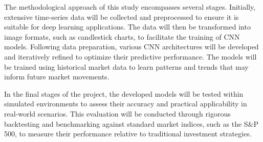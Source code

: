 \thesisspacing %

The methodological approach of this study encompasses several stages. Initially, extensive time-series data will be collected and preprocessed to ensure it is suitable for deep learning applications. The data will then be transformed into image formats, such as candlestick charts, to facilitate the training of CNN models. Following data preparation, various CNN architectures will be developed and iteratively refined to optimize their predictive performance. The models will be trained using historical market data to learn patterns and trends that may inform future market movements.

In the final stages of the project, the developed models will be tested within simulated environments to assess their accuracy and practical applicability in real-world scenarios. This evaluation will be conducted through rigorous backtesting and benchmarking against standard market indices, such as the S\&P 500, to measure their performance relative to traditional investment strategies.